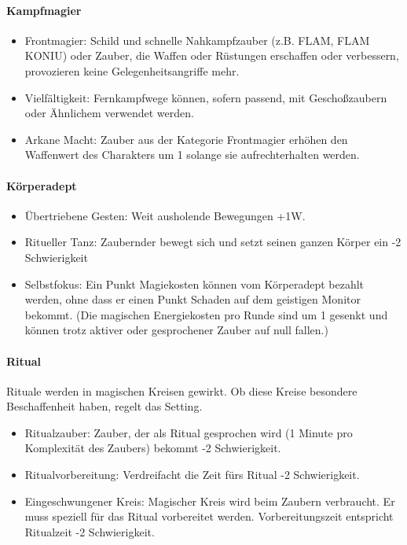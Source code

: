 \documentclass{article}
\begin{document}
\paragraph{Kampfmagier}

\begin{itemize}
\item Frontmagier: Schild und schnelle Nahkampfzauber (z.B. FLAM, FLAM KONIU) oder Zauber, die Waffen oder Rüstungen erschaffen oder verbessern, provozieren keine Gelegenheitsangriffe mehr.
\item Vielfältigkeit: Fernkampfwege können, sofern passend, mit Geschoßzaubern oder Ähnlichem verwendet werden.
\item Arkane Macht: Zauber aus der Kategorie Frontmagier erhöhen den Waffenwert des Charakters um 1 solange sie aufrechterhalten werden.
\end{itemize}

\paragraph{Körperadept}

\begin{itemize}
\item Übertriebene Gesten: Weit ausholende Bewegungen +1W.
\item Ritueller Tanz: Zaubernder bewegt sich und setzt seinen ganzen Körper ein -2 Schwierigkeit
\item Selbstfokus: Ein Punkt Magiekosten können vom Körperadept bezahlt werden, ohne dass er einen Punkt Schaden auf dem geistigen Monitor bekommt. (Die magischen Energiekosten pro Runde sind um 1 gesenkt und können trotz aktiver oder gesprochener Zauber auf null fallen.)
\end{itemize}

\paragraph{Ritual}

Rituale werden in magischen Kreisen gewirkt. Ob diese Kreise besondere Beschaffenheit haben, regelt das Setting.

\begin{itemize}
\item Ritualzauber: Zauber, der als Ritual gesprochen wird (1 Minute pro Komplexität des Zaubers) bekommt -2 Schwierigkeit.
\item Ritualvorbereitung: Verdreifacht die Zeit fürs Ritual -2 Schwierigkeit.
\item Eingeschwungener Kreis: Magischer Kreis wird beim Zaubern verbraucht. Er muss speziell für das Ritual vorbereitet werden. Vorbereitungszeit entspricht Ritualzeit -2 Schwierigkeit.
\end{itemize}
\end{document}
